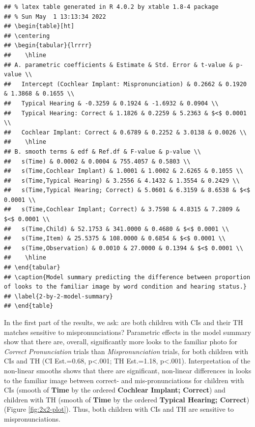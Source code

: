 \documentclass[
]{article}
\begin{document}
\begin{verbatim}
## % latex table generated in R 4.0.2 by xtable 1.8-4 package
## % Sun May  1 13:13:34 2022
## \begin{table}[ht]
## \centering
## \begin{tabular}{lrrrr}
##    \hline
## A. parametric coefficients & Estimate & Std. Error & t-value & p-value \\ 
##   Intercept (Cochlear Implant: Mispronunciation) & 0.2662 & 0.1920 & 1.3868 & 0.1655 \\ 
##   Typical Hearing & -0.3259 & 0.1924 & -1.6932 & 0.0904 \\ 
##   Typical Hearing: Correct & 1.1826 & 0.2259 & 5.2363 & $<$ 0.0001 \\ 
##   Cochlear Implant: Correct & 0.6789 & 0.2252 & 3.0138 & 0.0026 \\ 
##    \hline
## B. smooth terms & edf & Ref.df & F-value & p-value \\ 
##   s(Time) & 0.0002 & 0.0004 & 755.4057 & 0.5803 \\ 
##   s(Time,Cochlear Implant) & 1.0001 & 1.0002 & 2.6265 & 0.1055 \\ 
##   s(Time,Typical Hearing) & 3.2556 & 4.1432 & 1.3554 & 0.2429 \\ 
##   s(Time,Typical Hearing; Correct) & 5.0601 & 6.3159 & 8.6538 & $<$ 0.0001 \\ 
##   s(Time,Cochlear Implant; Correct) & 3.7598 & 4.8315 & 7.2809 & $<$ 0.0001 \\ 
##   s(Time,Child) & 52.1753 & 341.0000 & 0.4680 & $<$ 0.0001 \\ 
##   s(Time,Item) & 25.5375 & 108.0000 & 0.6854 & $<$ 0.0001 \\ 
##   s(Time,Observation) & 0.0010 & 27.0000 & 0.1394 & $<$ 0.0001 \\ 
##    \hline
## \end{tabular}
## \caption{Model summary predicting the difference between proportion of looks to the familiar image by word condition and hearing status.} 
## \label{2-by-2-model-summary}
## \end{table}
\end{verbatim}

In the first part of the results, we ask: are both children with CIs and their TH matches sensitive to mispronunciations? Parametric effects in the model summary show that there are, overall, significantly more looks to the familiar photo for \emph{Correct Pronunciation} trials than \emph{Mispronunciation} trials, for both children with CIs and TH (CI Est.=0.68, p\textless.001; TH Est.=1.18, p\textless.001). Interpretation of the non-linear smooths shows that there are significant, non-linear differences in looks to the familiar image between correct- and mis-pronunciations for children with CIs (smooth of \textbf{Time} by the ordered \textbf{Cochlear Implant; Correct}) and children with TH (smooth of \textbf{Time} by the ordered \textbf{Typical Hearing; Correct}) (Figure \ref{fig:2x2-plot}). Thus, both children with CIs and TH are sensitive to mispronunciations.
\end{document}
